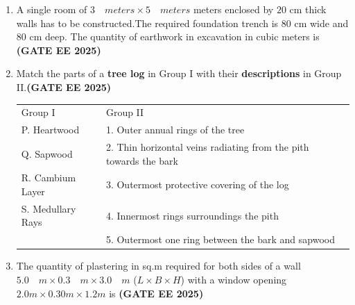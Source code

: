 \documentclass[journal,12pt,onecolumn]{IEEEtran}
\theoremstyle{remark}
\begin{document}
\begin{enumerate}
\item A single room of $3 \quad meters  \times 5 \quad meters$ meters enclosed by $20$ cm thick walls has to be constructed.The required foundation trench is $80$ cm wide and $80$ cm deep. The quantity of earthwork in excavation in cubic meters is \hfill \textbf{(GATE EE 2025)}
\begin{enumerate}
\end{enumerate}
\item Match the parts of a \textbf{tree log} in Group I with their \textbf{descriptions} in Group II.\hfill \textbf{(GATE EE 2025)}
\newline
\begin{tabular}{p{}p{}}
Group I     & Group II \\
P. Heartwood     & 1. Outer annual rings of the tree\\
Q. Sapwood & 2. Thin horizontal veins radiating from the pith towards the bark\\
R. Cambium Layer & 3. Outermost protective covering of the log\\
S. Medullary Rays & 4. Innermost rings surroundings the pith\\
    & 5. Outermost one ring between the bark and sapwood\\
\end{tabular}
\begin{enumerate}
\end{enumerate}
\item  The quantity of plastering in sq.m required for both sides of a wall $5.0 \quad m \times 0.3 \quad m \times 3.0 \quad m$ ($L \times B \times  H$) with a window opening $2.0m \times 0.30m \times 1.2 m$ is \hfill \textbf{(GATE EE 2025)}
\begin{enumerate}
\begin{multicols}{4}

\end{multicols}
\end{enumerate}
\end{enumerate}
\end{document}
